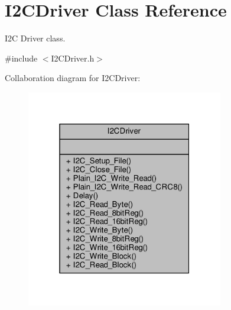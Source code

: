 \hypertarget{classI2CDriver}{}\section{I2\+C\+Driver Class Reference}
\label{classI2CDriver}


I2C Driver class.  




{\ttfamily \#include $<$I2\+C\+Driver.\+h$>$}



Collaboration diagram for I2\+C\+Driver\+:\nopagebreak
\begin{figure}[H]
\begin{center}
\leavevmode
\includegraphics[width=244pt]{classI2CDriver__coll__graph}
\end{center}
\end{figure}
